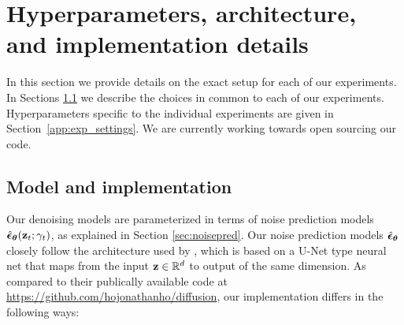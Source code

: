 \documentclass{article}
\begin{document}
\section{Hyperparameters, architecture, and implementation details}
\label{sec:hps}
In this section we provide details on the exact setup for each of our experiments. In Sections \ref{app:model} we describe the choices in common to each of our experiments. Hyperparameters specific to the individual experiments are given in Section~\ref{app:exp_settings}. We are currently working towards open sourcing our code.

\subsection{Model and implementation}
\label{app:model}
Our denoising models are parameterized in terms of noise prediction models $\hat{{\boldsymbol{\epsilon}}}_{{\boldsymbol{\theta}}}(
{\mathbf{z}}_{t}; \gamma_t)$, as explained in Section \ref{sec:noisepred}. Our noise prediction models $\hat{{\boldsymbol{\epsilon}}}_{{\boldsymbol{\theta}}}$ closely follow the architecture used by \cite{ho2020denoising}, which is based on a U-Net type neural net \citep{ronneberger2015u} that maps from the input ${\mathbf{z}} \in \mathbb{R}^{d}$ to output of the same dimension. As compared to their publically available code at \url{https://github.com/hojonathanho/diffusion}, our implementation differs in the following ways:
\end{document}
